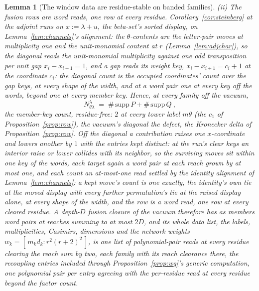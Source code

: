 \documentclass[11pt]{article}
\newtheorem{lemma}{Lemma}
\theoremstyle{definition}
\begin{document}
\begin{lemma}[The window data are residue-stable on banded families]
\emph{(ii) The fusion rows are word reads, one row at every
residue.} Corollary~\ref{cor:steinberg} at the adjoint runs on
$x:=\lambda+u$, the beta-set's sorted display, on
Lemma~\ref{lem:channels}'s alignment: the
$\theta$-contents are the letter-pair moves at multiplicity one and
the unit-monomial content at $r$
(Lemma~\ref{lem:adjchar}), so the diagonal reads the unit-monomial
multiplicity against one odd transposition per unit gap
$x_i-x_{i+1}=1$, and a gap reads its weight key,
$x_i-x_{i+1}=c_i+1$ at the coordinate $c_i$: the diagonal count is
the occupied coordinates' count over the gap keys, at every shape
of the width, and at a word pair one at every key off
the words, beyond one at every member key. Hence, at every family
off the vacuum,
\[
N^{\lambda}_{\theta\lambda}
\;=\;\#\,\mathrm{supp}\,P+\#\,\mathrm{supp}\,Q\ ,
\]
the member-key count, residue-free: $2$ at every tower label
$m\theta$ (the $c_1$ of
Proposition~\ref{prop:row}), the vacuum's diagonal the defect, the
Kronecker delta of Proposition~\ref{prop:row}. Off the
diagonal a contribution raises one $x$-coordinate and lowers another by
$1$ with the entries kept distinct: at the run's clear keys
an interior raise or lower collides with its neighbor, so the
surviving moves sit within one key of the words, each target again
a word pair at each reach grown by at most one, and each count an
at-most-one read settled
by the identity alignment of Lemma~\ref{lem:channels}: a kept
move's count is one exactly, the identity's own tie at the moved
display with every further permutation's tie at the raised display
alone, at every shape of the width, and the row is a
word read, one row at every cleared residue. A
depth-$D$ fusion closure
of the vacuum therefore has as members word pairs at reaches summing
to at most $2D$,
and its whole data list, the labels, multiplicities, Casimirs, dimensions
and the network weights $w_k=[\,m_kd_k:r^2(r+2)^2\,]$, is one list of polynomial-pair reads at every
residue clearing the reach sum by two, each family with its
reach clearance there, the recoupling
entries included through
Proposition~\ref{prop:wg}'s generic computation, one polynomial pair
per entry agreeing with the per-residue read at every residue beyond the factor
count.


\end{lemma}
\end{document}
